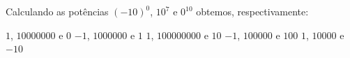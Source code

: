 Calculando as potências $(-10)^0$, $10^7$ e $0^{10}$ obtemos, respectivamente:

$1$, $10000000$ e $0$
$-1$, $1000000$ e $1$
$1$, $100000000$ e $10$
$-1$, $100000$ e $100$
$1$, $10000$ e $-10$


